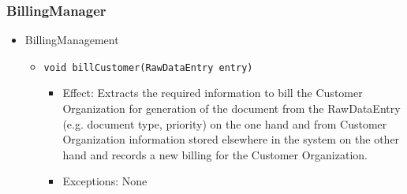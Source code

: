 \documentclass[a4paper,10pt]{article}
\begin{document}
\subsubsection*{BillingManager}
\begin{itemize}
	\item BillingManagement
	\begin{itemize}
		\item \texttt{void billCustomer(RawDataEntry entry)}
		\begin{itemize}
			\item Effect: Extracts the required information to bill the Customer Organization for generation of the document from the RawDataEntry (e.g. document type, priority) on the one hand and from Customer Organization information stored elsewhere in the system on the other hand and records a new billing for the Customer Organization.
			\item Exceptions: None
		\end{itemize}
	\end{itemize}
\end{itemize}
\end{document}
